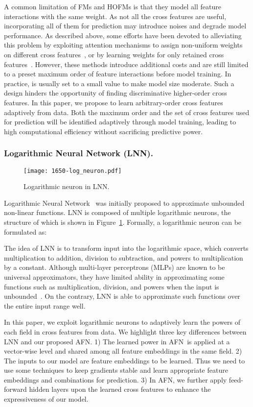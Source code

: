 \documentclass[letterpaper]{article} \usepackage{aaai20}  \usepackage{times}  \usepackage{helvet} \usepackage{courier}  \usepackage[hyphens]{url}  \usepackage{graphicx} \urlstyle{rm} \def\UrlFont{\rm}  \usepackage{graphicx}  \frenchspacing  \setlength{\pdfpagewidth}{8.5in}  \setlength{\pdfpageheight}{11in}
\newcommand{\model}{{AFN}~}
\newcommand{\modelns}{{AFN}}
\begin{document}
A common limitation of FMs and HOFMs is that they model all feature interactions with the same weight. As not all the cross features are useful, incorporating all of them for prediction may introduce noises and degrade model performance. As described above, some efforts have been devoted to alleviating this problem by exploiting attention mechanisms to assign non-uniform weights on different cross features~\cite{AFM}, or by learning weights for only retained cross features~\cite{xDeepFM}. However, these methods introduce additional costs and are still limited to a preset maximum order  of feature interactions before model training. In practice,  is usually set to a small value to make model size moderate. Such a design hinders the opportunity of finding discriminative higher-order cross features.
In this paper, we propose to learn arbitrary-order cross features adaptively from data. Both the maximum order and the set of cross features used for prediction will be identified adaptively through model training, leading to high computational efficiency without sacrificing predictive power.

\subsubsection{Logarithmic Neural Network (LNN).}
\begin{figure}[t]
\centering  
	\texttt{[image: 1650-log\_neuron.pdf]} 
	\caption{Logarithmic neuron in LNN.}
	\label{fig:log_neuron}
\end{figure}
Logarithmic Neural Network~\cite{lnn} was initially proposed to approximate unbounded non-linear functions. LNN is composed of multiple logarithmic neurons, the structure of which is shown in Figure~\ref{fig:log_neuron}.
Formally, a logarithmic neuron can be formulated as:

The idea of LNN is to transform input into the logarithmic space, which converts multiplication to addition, division to subtraction, and powers to multiplication by a constant.
Although multi-layer perceptrons (MLPs) are known to be universal approximators, they have limited ability in approximating some functions such as multiplication, division, and powers when the input is unbounded~\cite{lnn}.
On the contrary, LNN is able to approximate such functions over the entire input range well.

In this paper, we exploit logarithmic neurons  
to adaptively learn the powers of each field in cross features from data.
We highlight three key differences between LNN and our proposed \modelns. 1) The learned power in \model is applied at a vector-wise level and shared among all feature embeddings in the same field. 2) The inputs to our model are feature embeddings to be learned. Thus we need to use some techniques to keep gradients stable and learn appropriate feature embeddings and combinations for prediction.
3) In \modelns, we further apply feed-forward hidden layers upon the learned cross features to enhance the expressiveness of our model.
\end{document}
